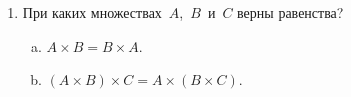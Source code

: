 \begin{enumerate}%
  \item При каких множествах~$A$,~$B$~и~$C$ верны равенства?
    \begin{enumerate}[a)]%
      \item $ A \times B = B \times A $.
      \item $ (A \times B) \times C = A \times (B \times C) $.
    \end{enumerate}
\end{enumerate}